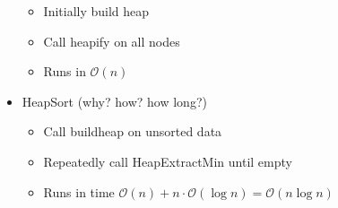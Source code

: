 \documentclass{article}[18pt]
\begin{document}
\begin{itemize}
	\begin{itemize}
		\item Initially build heap
		\item Call heapify on all nodes
		\item Runs in $\mathcal{O}(n)$
	\end{itemize}
	\item HeapSort (why? how? how long?)
	\begin{itemize}
		\item Call buildheap on unsorted data
		\item Repeatedly call HeapExtractMin until empty
		\item Runs in time $\mathcal{O}(n)+n\cdot\mathcal{O}(\log n)=\mathcal{O}(n\log n)$
	\end{itemize}
\end{itemize}
\end{document}
